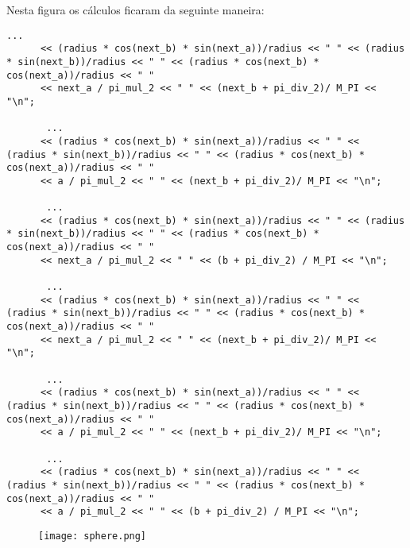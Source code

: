 \documentclass[11pt,a4paper]{report}
\begin{document}
Nesta figura os cálculos ficaram da seguinte maneira:
\begin{multicols}{2}
\begin{lstlisting}[style = code]
       ...	
      << (radius * cos(next_b) * sin(next_a))/radius << " " << (radius * sin(next_b))/radius << " " << (radius * cos(next_b) * cos(next_a))/radius << " "
      << next_a / pi_mul_2 << " " << (next_b + pi_div_2)/ M_PI << "\n";
			
       ...
      << (radius * cos(next_b) * sin(next_a))/radius << " " <<  (radius * sin(next_b))/radius << " " << (radius * cos(next_b) * cos(next_a))/radius << " "
      << a / pi_mul_2 << " " << (next_b + pi_div_2)/ M_PI << "\n";

       ...
      << (radius * cos(next_b) * sin(next_a))/radius << " " << (radius * sin(next_b))/radius << " " << (radius * cos(next_b) * cos(next_a))/radius << " "
      << next_a / pi_mul_2 << " " << (b + pi_div_2) / M_PI << "\n";

       ...
      << (radius * cos(next_b) * sin(next_a))/radius << " " <<  (radius * sin(next_b))/radius << " " << (radius * cos(next_b) * cos(next_a))/radius << " "
      << next_a / pi_mul_2 << " " << (next_b + pi_div_2)/ M_PI << "\n";

       ...
      << (radius * cos(next_b) * sin(next_a))/radius << " " <<  (radius * sin(next_b))/radius << " " << (radius * cos(next_b) * cos(next_a))/radius << " "
      << a / pi_mul_2 << " " << (next_b + pi_div_2)/ M_PI << "\n";

       ...
      << (radius * cos(next_b) * sin(next_a))/radius << " " <<  (radius * sin(next_b))/radius << " " << (radius * cos(next_b) * cos(next_a))/radius << " "
      << a / pi_mul_2 << " " << (b + pi_div_2) / M_PI << "\n";
\end{lstlisting}
\end{multicols}
\begin{figure}[h]
    \centering
    \texttt{[image: sphere.png]}
\end{figure}
\newpage
\end{document}
